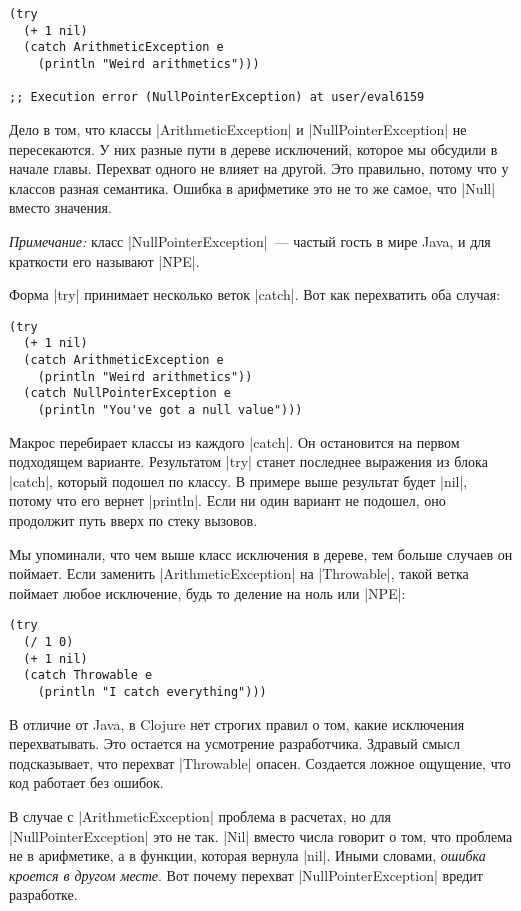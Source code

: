 \begin{verbatim}
(try
  (+ 1 nil)
  (catch ArithmeticException e
    (println "Weird arithmetics")))

;; Execution error (NullPointerException) at user/eval6159
\end{verbatim}

Дело в том, что классы \spverb|ArithmeticException| и
\spverb|NullPointerException| не пересекаются. У них разные пути в дереве
исключений, которое мы обсудили в начале главы. Перехват одного не влияет на
другой. Это правильно, потому что у классов разная семантика. Ошибка в
арифметике это не то же самое, что \spverb|Null| вместо значения.

\emph{Примечание:} класс \spverb|NullPointerException|~--- частый гость в мире
Java, и для краткости его называют \spverb|NPE|.

Форма \spverb|try| принимает несколько веток \spverb|catch|. Вот как перехватить
оба случая:

\begin{verbatim}
(try
  (+ 1 nil)
  (catch ArithmeticException e
    (println "Weird arithmetics"))
  (catch NullPointerException e
    (println "You've got a null value")))
\end{verbatim}

Макрос перебирает классы из каждого \spverb|catch|. Он остановится на первом
подходящем варианте. Результатом \spverb|try| станет последнее выражения из
блока \spverb|catch|, который подошел по классу. В примере выше результат будет
\spverb|nil|, потому что его вернет \spverb|println|. Если ни один вариант не
подошел, оно продолжит путь вверх по стеку вызовов.

Мы упоминали, что чем выше класс исключения в дереве, тем больше случаев он
поймает. Если заменить \spverb|ArithmeticException| на \spverb|Throwable|, такой
ветка поймает любое исключение, будь то деление на ноль или \spverb|NPE|:

\begin{verbatim}
(try
  (/ 1 0)
  (+ 1 nil)
  (catch Throwable e
    (println "I catch everything")))
\end{verbatim}

В отличие от Java, в Clojure нет строгих правил о том, какие исключения
перехватывать. Это остается на усмотрение разработчика. Здравый смысл
подсказывает, что перехват \spverb|Throwable| опасен. Создается ложное ощущение,
что код работает без ошибок.

В случае с \spverb|ArithmeticException| проблема в расчетах, но для
\spverb|NullPointerException| это не так. \spverb|Nil| вместо числа говорит о
том, что проблема не в арифметике, а в функции, которая вернула
\spverb|nil|. Иными словами, \emph{ошибка кроется в другом месте}. Вот почему
перехват \spverb|NullPointerException| вредит разработке.

